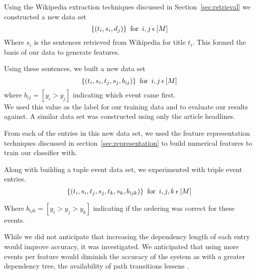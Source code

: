 \documentclass[bsc,frontabs,twoside,singlespacing,parskip,deptreport]{infthesis}     %
\begin{document}
    Using the Wikipedia extraction techniques discussed in Section~\ref{sec:retrieval} we constructed a new data set
    \begin{equation}
      \{(t_{i},s_{i},d_{j})\} \hspace{0.5em} \text{for} \hspace{0.5em}i,j  \hspace{0.2em}\epsilon \hspace{0.2em}[M]\nonumber
    \end{equation}
    Where $s_i$ is the sentences retrieved from Wikipedia for title $t_i$. 
    This formed the basis of our data to generate features.

    Using these sentences, we built a new data set
    \begin{equation}
      \{(t_{i},s_{i},t_{j},s_{j},b_{ij})\} \hspace{0.5em} \text{for} \hspace{0.5em} i,j \hspace{0.2em}\epsilon \hspace{0.2em}[M]\nonumber
    \end{equation}
    where $b_{ij} = [y_{i} > y_{j}]$ indicating which event came first.\\
    We used this value as the label for our training data and to evaluate our results against.
    A similar data set was constructed using only the article headlines.
    
    From each of the entries in this new data set, we used the feature representation techniques discussed in section~\ref{sec:representation} to build numerical
    features to train our classifier with.

Along with building a tuple event data set, we experimented with triple event entries.
\begin{equation}
      \{(t_{i},s_{i},t_{j},s_{j},t_{k},s_{k},b_{ijk})\} \hspace{0.5em} \text{for} \hspace{0.5em} i,j,k \hspace{0.2em}\epsilon \hspace{0.2em}[M]\nonumber
\end{equation}

Where $b_{ijk} = [y_i > y_j > y_k]$ indicating if the ordering was correct for these events.

While we did not anticipate that increasing the dependency length of each entry would improve accuracy, it was investigated.
We anticipated that using more events per feature would diminish the accuracy of the system as
with a greater dependency tree, the availability of path transitions lessens \cite{gerdes2013computational}.
\end{document}
